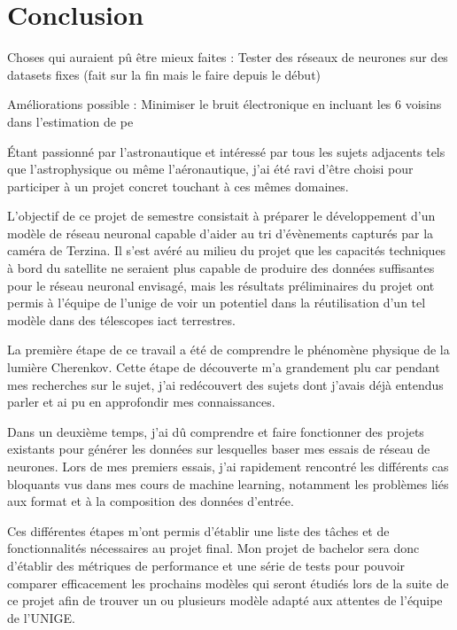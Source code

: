 \chapter*{Conclusion}


Choses qui auraient pû être mieux faites :
Tester des réseaux de neurones sur des datasets fixes (fait sur la fin mais le faire depuis le début)

Améliorations possible :
Minimiser le bruit électronique en incluant les 6 voisins dans l'estimation de \gls{pe}




Étant passionné par l'astronautique et intéressé 
par tous les sujets adjacents tels que l'astrophysique ou même l'aéronautique, 
j'ai été ravi d'être choisi pour participer à un projet concret touchant à ces mêmes domaines.

L'objectif de ce projet de semestre consistait à préparer le développement d'un modèle de réseau neuronal
capable d'aider au tri d'évènements capturés par la caméra de Terzina. 
Il s'est avéré au milieu du projet que les capacités techniques à bord du satellite ne seraient plus capable 
de produire des données suffisantes pour le réseau neuronal envisagé, mais les résultats préliminaires du projet ont permis 
à l'équipe de l'\gls{unige} de voir un potentiel dans la réutilisation d'un tel modèle dans des télescopes \gls{iact} terrestres.

La première étape de ce travail a été de comprendre le phénomène physique
de la lumière Cherenkov. Cette étape de découverte m'a grandement plu car pendant mes recherches sur le sujet,
j'ai redécouvert des sujets dont j'avais déjà entendus parler et ai pu en approfondir mes connaissances.

Dans un deuxième temps, j'ai dû comprendre et faire fonctionner des projets existants pour générer les données 
sur lesquelles baser mes essais de réseau de neurones.
Lors de mes premiers essais, j'ai rapidement rencontré les différents cas bloquants vus dans mes cours de machine learning,
notamment les problèmes liés aux format et à la composition des données d'entrée.

Ces différentes étapes m'ont permis d'établir une liste des tâches et de fonctionnalités nécessaires au projet final.
Mon projet de bachelor sera donc d'établir des métriques de performance et une série de tests pour pouvoir comparer efficacement 
les prochains modèles qui seront étudiés lors de la suite de ce projet afin de trouver un ou plusieurs modèle adapté aux attentes de l'équipe de l'UNIGE.
